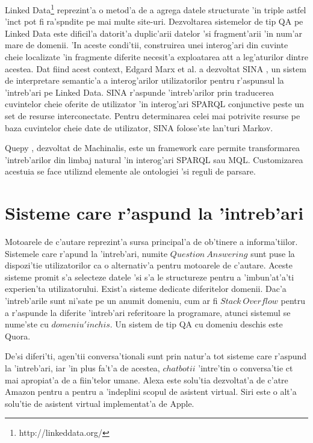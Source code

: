\documentclass[12pt,a4paper,twoside]{report}
\begin{document}
Linked Data\footnote{http://linkeddata.org/}  reprezint'a o metod'a de a agrega datele structurate 'in triple astfel 'inc\ia t pot fi ra'sp\ia ndite pe mai multe site-uri. Dezvoltarea sistemelor de tip QA pe Linked Data este dificil'a datorit'a duplic'arii datelor 'si fragment'arii 'in num'ar mare de  domenii. 'In aceste condi'tii, construirea unei interog'ari din cuvinte cheie localizate 'in fragmente diferite necesit'a exploatarea at\ia t a leg'aturilor dintre acestea. Dat fiind acest context, Edgard Marx et al. a dezvoltat SINA \cite{sina}, un sistem de interpretare semantic'a a interog'arilor utilizatorilor pentru r'aspunsul la 'intreb'ari pe Linked Data.  SINA r'aspunde 'intreb'arilor prin traducerea cuvintelor cheie oferite de utilizator 'in interog'ari SPARQL conjunctive peste un set de resurse interconectate. Pentru determinarea celei mai potrivite resurse pe baza cuvintelor cheie date de utilizator, SINA folose'ste lan'turi Markov. 

Quepy \cite{quepyCite}, dezvoltat de Machinalis, este un framework care permite transformarea 'intreb'arilor din limbaj natural 'in interog'ari SPARQL sau MQL. Customizarea acestuia se face utiliz\ia nd elemente ale ontologiei 'si reguli de parsare.


\section{Sisteme care r'aspund la 'intreb'ari}

Motoarele de c'autare reprezint'a sursa principal'a de ob'tinere a informa'tiilor. Sistemele care r'apund la 'intreb'ari, numite $Question\ Answering$ sunt puse la dispozi'tie utilizatorilor ca o alternativ'a pentru motoarele de c'autare. Aceste sisteme promit s'a selecteze datele 'si s'a le structureze pentru a 'imbun'at'a'ti experien'ta utilizatorului. Exist'a sisteme dedicate diferitelor domenii. Dac'a 'intreb'arile sunt ni'sate pe un anumit domeniu, cum ar fi $Stack\ Overflow$ pentru a r'aspunde la diferite 'intreb'ari referitoare la programare, atunci sistemul se nume'ste cu $domeniu 'inchis$. Un sistem de tip QA cu domeniu deschis este Quora.

De'si diferi'ti, agen'tii conversa'tionali sunt prin natur'a tot sisteme care r'aspund la 'intreb'ari, iar 'in plus fa't'a de acestea, $chatbotii$ 'intre'tin o conversa'tie c\ia t mai apropiat'a de a fiin'telor umane. Alexa este solu'tia dezvoltat'a de c'atre Amazon pentru a pentru a 'indeplini scopul de asistent virtual. Siri este o alt'a solu'tie de asistent virtual implementat'a de Apple.
\end{document}
